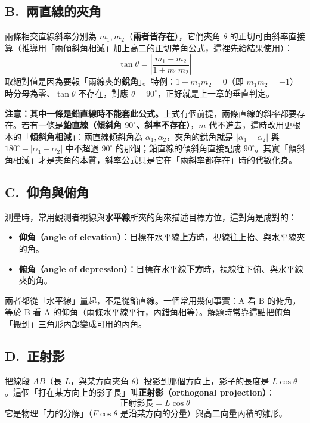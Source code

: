 \documentclass[11pt]{article}
\begin{document}
\subsection*{\sffamily B.\ 兩直線的夾角}

兩條相交直線斜率分別為 $m_1,m_2$（\textbf{兩者皆存在}），它們夾角 $\theta$ 的正切可由斜率直接算（推導用「兩傾斜角相減」加上高二的正切差角公式，這裡先給結果使用）：
$$\boxed{\;\tan\theta=\left|\frac{m_1-m_2}{1+m_1m_2}\right|\;}$$
取絕對值是因為要報「兩線夾的\textbf{銳角}」。特例：$1+m_1m_2=0$（即 $m_1m_2=-1$）時分母為零、$\tan\theta$ 不存在，對應 $\theta=90^\circ$，正好就是上一章的垂直判定。

\textbf{注意：其中一條是鉛直線時不能套此公式。}上式有個前提，兩條直線的斜率都要存在。若有一條是\textbf{鉛直線（傾斜角 $90^\circ$、斜率不存在）}，$m$ 代不進去，這時改用更根本的「\textbf{傾斜角相減}」：兩直線傾斜角為 $\alpha_1,\alpha_2$，夾角的銳角就是 $|\alpha_1-\alpha_2|$ 與 $180^\circ-|\alpha_1-\alpha_2|$ 中不超過 $90^\circ$ 的那個；鉛直線的傾斜角直接記成 $90^\circ$。其實「傾斜角相減」才是夾角的本質，斜率公式只是它在「兩斜率都存在」時的代數化身。

\subsection*{\sffamily C.\ 仰角與俯角}

測量時，常用觀測者視線與\textbf{水平線}所夾的角來描述目標方位，這對角是成對的：
\begin{itemize}\setlength{\itemsep}{1pt}
\item \textbf{仰角（angle of elevation）}：目標在水平線\textbf{上方}時，視線往上抬、與水平線夾的角。
\item \textbf{俯角（angle of depression）}：目標在水平線\textbf{下方}時，視線往下俯、與水平線夾的角。
\end{itemize}
兩者都從「水平線」量起，不是從鉛直線。一個常用幾何事實：A 看 B 的俯角，等於 B 看 A 的仰角（兩條水平線平行，內錯角相等）。解題時常靠這點把俯角「搬到」三角形內部變成可用的內角。


\subsection*{\sffamily D.\ 正射影}

把線段 $\overline{AB}$（長 $L$，與某方向夾角 $\theta$）投影到那個方向上，影子的長度是 $L\cos\theta$。這個「打在某方向上的影子長」叫\textbf{正射影（orthogonal projection）}：
$$\boxed{\;\text{正射影長}=L\cos\theta\;}$$
它是物理「力的分解」（$F\cos\theta$ 是沿某方向的分量）與高二向量內積的雛形。
\end{document}
